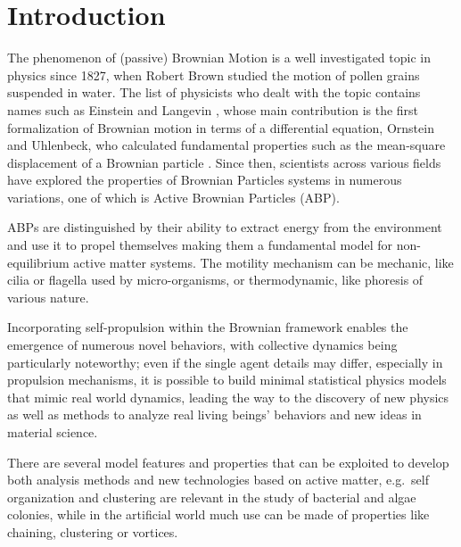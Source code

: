 \documentclass[../../master_thesis_np.tex]{subfiles}
\begin{document}
 
\chapter{Introduction}
	The phenomenon of (passive) Brownian Motion is a well investigated topic in physics since 1827, when Robert Brown studied the motion of pollen grains suspended in water. The list of physicists who dealt with the topic contains names such as Einstein and Langevin \parencite{gardiner_handbook_2004}, whose main contribution is the first formalization of Brownian motion in terms of a differential equation, Ornstein and Uhlenbeck, who calculated fundamental properties such as the mean-square displacement of a Brownian particle \parencite{uhlenbeck_theory_1930}. Since then, scientists across various fields have explored the properties of Brownian Particles systems in numerous variations, one of which is Active Brownian Particles (ABP). 
	
	ABPs are distinguished by their ability to extract energy from the environment and use it to propel themselves making them a fundamental model for non-equilibrium active matter systems.	
	The motility mechanism can be mechanic, like cilia or flagella used by micro-organisms, or thermodynamic, like phoresis of various nature. 
	
	Incorporating self-propulsion within the Brownian framework enables the emergence of numerous novel behaviors, with collective dynamics being particularly noteworthy; even if the single agent details may differ, especially in propulsion mechanisms, it is possible to build minimal statistical physics models that mimic real world dynamics, leading the way to the discovery of new physics as well as methods to analyze real living beings' behaviors and new ideas in material science. 
	
	There are several model features and properties that can be exploited to develop both analysis methods and new technologies based on active matter, e.g.\ self organization and clustering are relevant in the study of bacterial and algae colonies, while in the artificial world much use can be made of properties like chaining, clustering or vortices.
	\newpage
	
\end{document}
